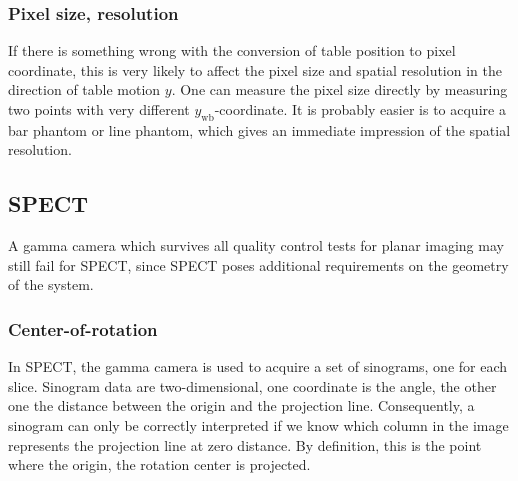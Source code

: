 \documentclass[11pt,oneside]{book}
\begin{document}
\subsubsection{Pixel size, resolution}
If there is something wrong with the conversion of table position to pixel
coordinate, this is very likely to affect the pixel size and spatial
resolution in the direction of table motion $y$. One can measure the pixel
size directly by measuring two points with very different
$y_{\mbox{wb}}$-coordinate. It is probably easier is to acquire a bar phantom
or line phantom, which gives an immediate impression of the spatial
resolution.


\subsection{SPECT}
A gamma camera which survives all quality control tests for planar
imaging may still fail for SPECT, since SPECT poses additional
requirements on the geometry of the system.

\subsubsection{Center-of-rotation}
In SPECT, the gamma camera is used to acquire a set of sinograms, one for each
slice. Sinogram data are two-dimensional, one coordinate is the angle, the
other one the distance between the origin and the projection
line. Consequently, a sinogram can only be correctly interpreted if we know
which column in the image represents the projection line at zero distance. By
definition, this is the point where the origin, the rotation center is
projected.
\end{document}
